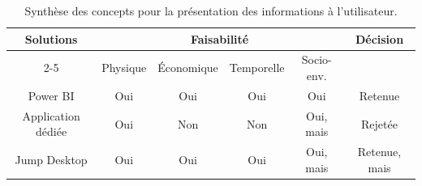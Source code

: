 \renewcommand{\arraystretch}{1.3}

\begin{table}[H]
  \centering
  \begin{tabular}{|c|c|c|c|c|c|}
    \hline
    \multirow{2}{*}{\textbf{Solutions}}
    & \multicolumn{4}{c|}{\textbf{Faisabilité}}
    & \multirow{2}{*}{\textbf{Décision}}
    \\ \cline{2-5}
    & Physique                                  & Économique & Temporelle & Socio-env. &               \\ \hline
    Power BI           & Oui                                       & Oui        & Oui        & Oui        & Retenue       \\ \hline
    Application dédiée & Oui                                       & Non        & Non        & Oui, mais  & Rejetée       \\ \hline
    Jump Desktop       & Oui                                       & Oui        & Oui        & Oui, mais  & Retenue, mais \\ \hline
  \end{tabular}
  \caption{Synthèse des concepts pour la présentation des informations à l'utilisateur.}
  \label{tab:tableau-synthese-fonction-6}
\end{table}
